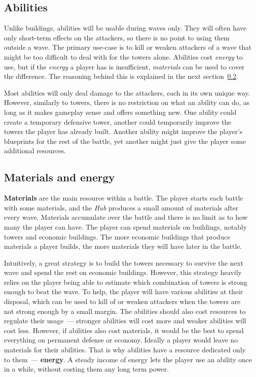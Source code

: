 \subsection{Abilities}\label{sec:design-abilities}

Unlike buildings, abilities will be usable during waves only.
They will often have only short-term effects on the attackers, so there is no point to using them outside a wave.
The primary use-case is to kill or weaken attackers of a wave that might be too difficult to deal with for the towers alone.
Abilities cost \emph{energy} to use, but if the \emph{energy} a player has is insufficient, \emph{materials} can be used to cover the difference.
The reasoning behind this is explained in the next section~\ref{sec:design-materials-and-energy}.

Most abilities will only deal damage to the attackers, each in its own unique way.
However, similarly to towers, there is no restriction on what an ability can do, as long as it makes gameplay sense and offers something new.
One ability could create a temporary defensive tower, another could temporarily improve the towers the player has already built.
Another ability might improve the player's blueprints for the rest of the battle, yet another might just give the player some additional resources.

\subsection{Materials and energy}\label{sec:design-materials-and-energy}

\textbf{Materials} are the main resource within a battle.
The player starts each battle with some materials, and the \emph{Hub} produces a small amount of materials after every wave.
Materials accumulate over the battle and there is no limit as to how many the player can have.
The player can spend materials on buildings, notably towers and economic buildings.
The more economic buildings that produce materials a player builds, the more materials they will have later in the battle.

Intuitively, a great strategy is to build the towers necessary to survive the next wave and spend the rest on economic buildings.
However, this strategy heavily relies on the player being able to estimate which combination of towers is strong enough to beat the wave.
To help, the player will have various abilities at their disposal, which can be used to kill of or weaken attackers when the towers are not strong enough by a small margin.
The abilities should also cost resources to regulate their usage~--- stronger abilities will cost more and weaker abilities will cost less.
However, if abilities also cost materials, it would be the best to spend everything on permanent defense or economy.
Ideally a player would leave no materials for their abilities.
That is why abilities have a resource dedicated only to them~--- \textbf{energy}.
A steady income of energy lets the player use an ability once in a while, without costing them any long term power.

